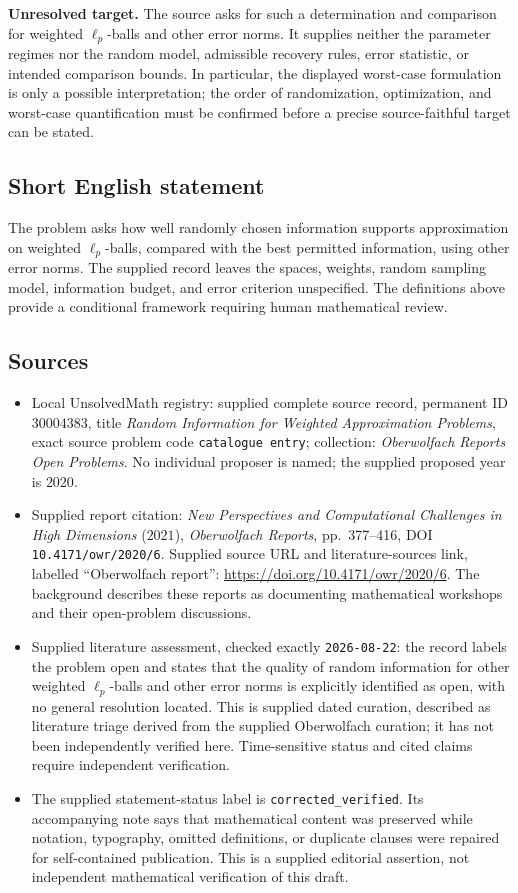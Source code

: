 \documentclass[11pt]{article}
\begin{document}
\textbf{Unresolved target.} The source asks for such a determination and comparison for weighted $\ell_p$-balls and other error norms. It supplies neither the parameter regimes nor the random model, admissible recovery rules, error statistic, or intended comparison bounds. In particular, the displayed worst-case formulation is only a possible interpretation; the order of randomization, optimization, and worst-case quantification must be confirmed before a precise source-faithful target can be stated.
\subsection{Short English statement}
The problem asks how well randomly chosen information supports approximation on weighted $\ell_p$-balls, compared with the best permitted information, using other error norms. The supplied record leaves the spaces, weights, random sampling model, information budget, and error criterion unspecified. The definitions above provide a conditional framework requiring human mathematical review.
\subsection{Sources}
\begin{itemize}
\item Local UnsolvedMath registry: supplied complete source record, permanent ID $30004383$, title \emph{Random Information for Weighted Approximation Problems}, exact source problem code \texttt{catalogue entry}; collection: \emph{Oberwolfach Reports Open Problems}. No individual proposer is named; the supplied proposed year is $2020$.
\item Supplied report citation: \emph{New Perspectives and Computational Challenges in High Dimensions} ($2021$), \emph{Oberwolfach Reports}, pp.~377--416, DOI \texttt{10.4171/owr/2020/6}. Supplied source URL and literature-sources link, labelled ``Oberwolfach report'': \url{https://doi.org/10.4171/owr/2020/6}. The background describes these reports as documenting mathematical workshops and their open-problem discussions.
\item Supplied literature assessment, checked exactly \texttt{2026-08-22}: the record labels the problem open and states that the quality of random information for other weighted $\ell_p$-balls and other error norms is explicitly identified as open, with no general resolution located. This is supplied dated curation, described as literature triage derived from the supplied Oberwolfach curation; it has not been independently verified here. Time-sensitive status and cited claims require independent verification.
\item The supplied statement-status label is \texttt{corrected\_verified}. Its accompanying note says that mathematical content was preserved while notation, typography, omitted definitions, or duplicate clauses were repaired for self-contained publication. This is a supplied editorial assertion, not independent mathematical verification of this draft.
\end{itemize}
\end{document}
